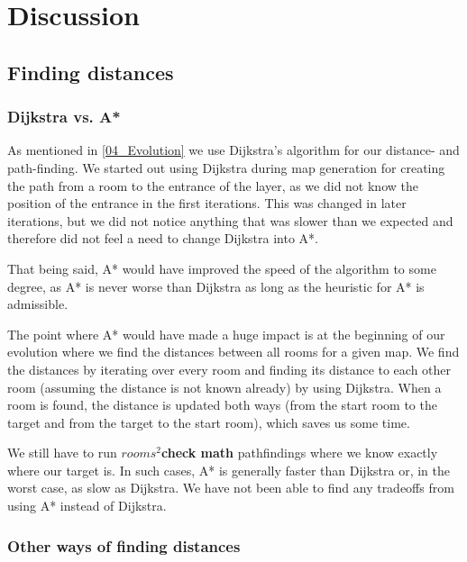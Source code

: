 \section{Discussion}
\label{06}


\subsection{Finding distances}
\label{06_Distances}

\subsubsection{Dijkstra vs. A*}

As mentioned in \ref{04_Evolution} we use Dijkstra's algorithm for our distance- and path-finding. We started out using Dijkstra during map generation for creating the path from a room to the entrance of the layer, as we did not know the position of the entrance in the first iterations. This was changed in later iterations, but we did not notice anything that was slower than we expected and therefore did not feel a need to change Dijkstra into A*\cite{AStar}\cite{AStarOriginal}.

That being said, A* would have improved the speed of the algorithm to some degree, as A* is never worse than Dijkstra as long as the heuristic for A* is admissible.

The point where A* would have made a huge impact is at the beginning of our evolution where we find the distances between all rooms for a given map. We find the distances by iterating over every room and finding its distance to each other room (assuming the distance is not known already) by using Dijkstra. When a room is found, the distance is updated both ways (from the start room to the target and from the target to the start room), which saves us some time.

We still have to run $rooms^2$\textbf{check math} pathfindings where we know exactly where our target is. In such cases, A* is generally faster than Dijkstra or, in the worst case, as slow as Dijkstra. We have not been able to find any tradeoffs from using A* instead of Dijkstra.

\subsubsection{Other ways of finding distances}

